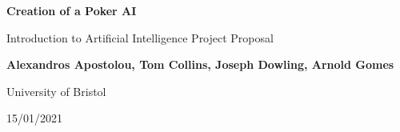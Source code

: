 \documentclass{article}
\begin{document}
\begin{titlepage}
    \begin{center}
        \vspace*{1cm}

        \Huge
        \textbf{Creation of a Poker AI}

        \vspace{0.5cm}
        \LARGE
        Introduction to Artificial Intelligence Project Proposal

        \vspace{1.5cm}

        \textbf{Alexandros Apostolou, Tom Collins, Joseph Dowling, Arnold Gomes}

        \vfill



        \vspace{0.8cm}

        University of Bristol

        \Large
        15/01/2021

    \end{center}
\end{titlepage}
\end{document}
